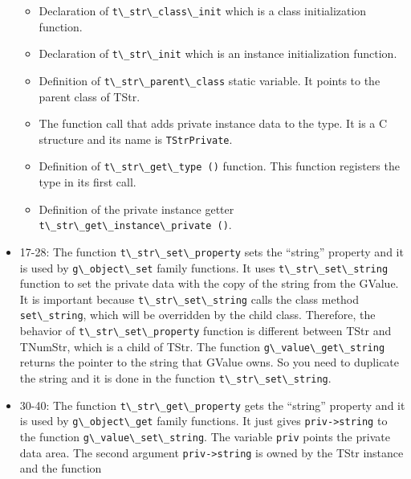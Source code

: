 \begin{itemize}
  \begin{itemize}
  \tightlist
  \item
    Declaration of \passthrough{\lstinline!t\_str\_class\_init!} which
    is a class initialization function.
  \item
    Declaration of \passthrough{\lstinline!t\_str\_init!} which is an
    instance initialization function.
  \item
    Definition of \passthrough{\lstinline!t\_str\_parent\_class!} static
    variable. It points to the parent class of TStr.
  \item
    The function call that adds private instance data to the type. It is
    a C structure and its name is \passthrough{\lstinline!TStrPrivate!}.
  \item
    Definition of \passthrough{\lstinline!t\_str\_get\_type ()!}
    function. This function registers the type in its first call.
  \item
    Definition of the private instance getter
    \passthrough{\lstinline!t\_str\_get\_instance\_private ()!}.
  \end{itemize}
\item
  17-28: The function \passthrough{\lstinline!t\_str\_set\_property!}
  sets the ``string'' property and it is used by
  \passthrough{\lstinline!g\_object\_set!} family functions. It uses
  \passthrough{\lstinline!t\_str\_set\_string!} function to set the
  private data with the copy of the string from the GValue. It is
  important because \passthrough{\lstinline!t\_str\_set\_string!} calls
  the class method \passthrough{\lstinline!set\_string!}, which will be
  overridden by the child class. Therefore, the behavior of
  \passthrough{\lstinline!t\_str\_set\_property!} function is different
  between TStr and TNumStr, which is a child of TStr. The function
  \passthrough{\lstinline!g\_value\_get\_string!} returns the pointer to
  the string that GValue owns. So you need to duplicate the string and
  it is done in the function
  \passthrough{\lstinline!t\_str\_set\_string!}.
\item
  30-40: The function \passthrough{\lstinline!t\_str\_get\_property!}
  gets the ``string'' property and it is used by
  \passthrough{\lstinline!g\_object\_get!} family functions. It just
  gives \passthrough{\lstinline!priv->string!} to the function
  \passthrough{\lstinline!g\_value\_set\_string!}. The variable
  \passthrough{\lstinline!priv!} points the private data area. The
  second argument \passthrough{\lstinline!priv->string!} is owned by the
  TStr instance and the function

\end{itemize}
